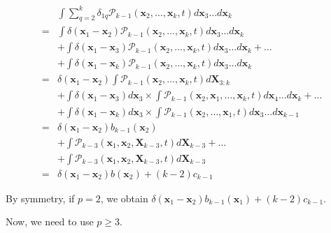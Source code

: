 \begin{subequations} 
\begin{flalign}
 & \int\sum_{q=2}^{k}\delta_{1q}\mathcal{P}_{k-1}(\boldsymbol{x}_{2},\ldots,\boldsymbol{x}_{k},t)d\boldsymbol{x}_{3}\ldots d\boldsymbol{x}_{k}\\
= & \int\delta(\boldsymbol{x}_{1}-\boldsymbol{x}_{2})\mathcal{P}_{k-1}(\boldsymbol{x}_{2},\ldots,\boldsymbol{x}_{k},t)d\boldsymbol{x}_{3}\ldots d\boldsymbol{x}_{k}\\
 & +\int\delta(\boldsymbol{x}_{1}-\boldsymbol{x}_{3})\mathcal{P}_{k-1}(\boldsymbol{x}_{2},\ldots,\boldsymbol{x}_{k},t)d\boldsymbol{x}_{3}\ldots d\boldsymbol{x}_{k}+\ldots\\
 & +\int\delta(\boldsymbol{x}_{1}-\boldsymbol{x}_{k})\mathcal{P}_{k-1}(\boldsymbol{x}_{2},\ldots,\boldsymbol{x}_{k},t)d\boldsymbol{x}_{3}\ldots d\boldsymbol{x}_{k}\\
= & \delta(\boldsymbol{x}_{1}-\boldsymbol{x}_{2})\int\mathcal{P}_{k-1}(\boldsymbol{x}_{2},\ldots,\boldsymbol{x}_{k},t)d\boldsymbol{X}_{3:k}\\
 & +\int\delta(\boldsymbol{x}_{1}-\boldsymbol{x}_{3})d\boldsymbol{x}_{3}\times\int\mathcal{P}_{k-1}(\boldsymbol{x}_{2},\boldsymbol{x}_{1},\ldots,\boldsymbol{x}_{k},t)d\boldsymbol{x}_{4}\ldots d\boldsymbol{x}_{k}+\ldots\\
 & +\int\delta(\boldsymbol{x}_{1}-\boldsymbol{x}_{k})d\boldsymbol{x}_{3}\times\int\mathcal{P}_{k-1}(\boldsymbol{x}_{2},\ldots,\boldsymbol{x}_{1},t)d\boldsymbol{x}_{3}\ldots d\boldsymbol{x}_{k-1}\\
= & \delta(\boldsymbol{x}_{1}-\boldsymbol{x}_{2})b_{k-1}(\boldsymbol{x}_{2})\\
 & +\int\mathcal{P}_{k-3}(\boldsymbol{x}_{1},\boldsymbol{x}_{2},\boldsymbol{X}_{k-3},t)d\boldsymbol{X}_{k-3}+\ldots\\
 & +\int\mathcal{P}_{k-3}(\boldsymbol{x}_{1},\boldsymbol{x}_{2},\boldsymbol{X}_{k-3},t)d\boldsymbol{X}_{k-3}\\
= & \delta(\boldsymbol{x}_{1}-\boldsymbol{x}_{2})b(\boldsymbol{x}_{2})+(k-2)c_{k-1}
\end{flalign}
\end{subequations}

By symmetry, if $p=2$, we obtain $\delta(\boldsymbol{x}_{1}-\boldsymbol{x}_{2})b_{k-1}(\boldsymbol{x}_{1})+(k-2)c_{k-1}$.

Now, we need to use $p\geq3$.

